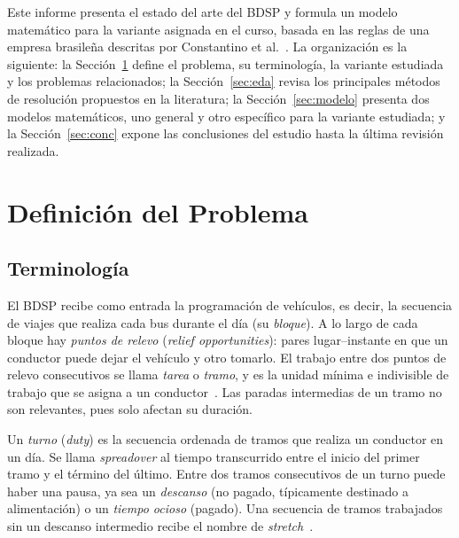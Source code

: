 \documentclass[letter, 10pt]{article}
\begin{document}
Este informe presenta el estado del arte del BDSP y formula un modelo matemático para la variante asignada en el curso, basada en las reglas de una empresa brasileña descritas por Constantino et al.~\cite{Constantino2017}. La organización es la siguiente: la Sección~\ref{sec:def} define el problema, su terminología, la variante estudiada y los problemas relacionados; la Sección~\ref{sec:eda} revisa los principales métodos de resolución propuestos en la literatura; la Sección~\ref{sec:modelo} presenta dos modelos matemáticos, uno general y otro específico para la variante estudiada; y la Sección~\ref{sec:conc} expone las conclusiones del estudio hasta la última revisión realizada.

\section{Definici\'on del Problema}\label{sec:def}

\subsection{Terminología}
El BDSP recibe como entrada la programación de vehículos, es decir, la secuencia de viajes que realiza cada bus durante el día (su \emph{bloque}). A lo largo de cada bloque hay \emph{puntos de relevo} (\emph{relief opportunities}): pares lugar--instante en que un conductor puede dejar el vehículo y otro tomarlo. El trabajo entre dos puntos de relevo consecutivos se llama \emph{tarea} o \emph{tramo}, y es la unidad mínima e indivisible de trabajo que se asigna a un conductor~\cite{Constantino2017}. Las paradas intermedias de un tramo no son relevantes, pues solo afectan su duración.

Un \emph{turno} (\emph{duty}) es la secuencia ordenada de tramos que realiza un conductor en un día. Se llama \emph{spreadover} al tiempo transcurrido entre el inicio del primer tramo y el término del último. Entre dos tramos consecutivos de un turno puede haber una pausa, ya sea un \emph{descanso} (no pagado, típicamente destinado a alimentación) o un \emph{tiempo ocioso} (pagado). Una secuencia de tramos trabajados sin un descanso intermedio recibe el nombre de \emph{stretch}~\cite{Constantino2017,DeLeone2011a}.
\end{document}
